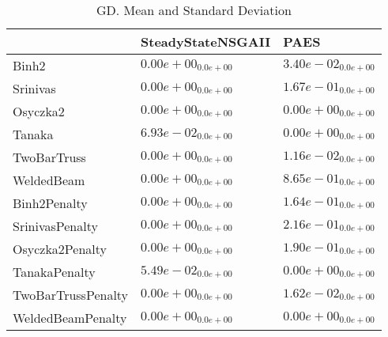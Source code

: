 \documentclass{article}
\begin{document}
\begin{table}
\caption{GD. Mean and Standard Deviation}
\label{table: GD}
\centering
\begin{scriptsize}
\begin{tabular}{lll}
\hline & SteadyStateNSGAII &  PAES\\
\hline 
Binh2 & \cellcolor{gray95}$  0.00e+00_{ 0.0e+00}$ & \cellcolor{gray25}$  3.40e-02_{ 0.0e+00}$ \\
Srinivas & \cellcolor{gray95}$  0.00e+00_{ 0.0e+00}$ & \cellcolor{gray25}$  1.67e-01_{ 0.0e+00}$ \\
Osyczka2 & \cellcolor{gray95}$  0.00e+00_{ 0.0e+00}$ & \cellcolor{gray25}$  0.00e+00_{ 0.0e+00}$ \\
Tanaka & \cellcolor{gray25}$  6.93e-02_{ 0.0e+00}$ & \cellcolor{gray95}$  0.00e+00_{ 0.0e+00}$ \\
TwoBarTruss & \cellcolor{gray95}$  0.00e+00_{ 0.0e+00}$ & \cellcolor{gray25}$  1.16e-02_{ 0.0e+00}$ \\
WeldedBeam & \cellcolor{gray95}$  0.00e+00_{ 0.0e+00}$ & \cellcolor{gray25}$  8.65e-01_{ 0.0e+00}$ \\
Binh2Penalty & \cellcolor{gray95}$  0.00e+00_{ 0.0e+00}$ & \cellcolor{gray25}$  1.64e-01_{ 0.0e+00}$ \\
SrinivasPenalty & \cellcolor{gray95}$  0.00e+00_{ 0.0e+00}$ & \cellcolor{gray25}$  2.16e-01_{ 0.0e+00}$ \\
Osyczka2Penalty & \cellcolor{gray95}$  0.00e+00_{ 0.0e+00}$ & \cellcolor{gray25}$  1.90e-01_{ 0.0e+00}$ \\
TanakaPenalty & \cellcolor{gray25}$  5.49e-02_{ 0.0e+00}$ & \cellcolor{gray95}$  0.00e+00_{ 0.0e+00}$ \\
TwoBarTrussPenalty & \cellcolor{gray95}$  0.00e+00_{ 0.0e+00}$ & \cellcolor{gray25}$  1.62e-02_{ 0.0e+00}$ \\
WeldedBeamPenalty & \cellcolor{gray95}$  0.00e+00_{ 0.0e+00}$ & \cellcolor{gray25}$  0.00e+00_{ 0.0e+00}$ \\
\hline
\end{tabular}
\end{scriptsize}
\end{table}
\end{document}
